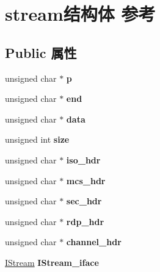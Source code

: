 \hypertarget{structstream}{}\section{stream结构体 参考}
\label{structstream}
\subsection*{Public 属性}
\begin{DoxyCompactItemize}
\item 
\mbox{\label{structstream_a915066714c875e52cfa687d7f29263b4}} 
unsigned char $\ast$ {\bfseries p}
\item 
\mbox{\label{structstream_a31d3762bda1936aae6fb6db2c8a24c20}} 
unsigned char $\ast$ {\bfseries end}
\item 
\mbox{\label{structstream_aa6f3631ab5672ed807cd42dfacf788e9}} 
unsigned char $\ast$ {\bfseries data}
\item 
\mbox{\label{structstream_a99de1abac22ca856543a42f1b8e73a3f}} 
unsigned int {\bfseries size}
\item 
\mbox{\label{structstream_a26977c17a426e04ce3bb335919d5353f}} 
unsigned char $\ast$ {\bfseries iso\+\_\+hdr}
\item 
\mbox{\label{structstream_a977d5d977e0a68aaf2bdb3bfb7163f16}} 
unsigned char $\ast$ {\bfseries mcs\+\_\+hdr}
\item 
\mbox{\label{structstream_a516690a70162124eab23ac16e00ed4ed}} 
unsigned char $\ast$ {\bfseries sec\+\_\+hdr}
\item 
\mbox{\label{structstream_ad64647fcfbee1fc89ea2f3eed72ef1be}} 
unsigned char $\ast$ {\bfseries rdp\+\_\+hdr}
\item 
\mbox{\label{structstream_a115b1d94f5ae8018f7db1b368a4a621b}} 
unsigned char $\ast$ {\bfseries channel\+\_\+hdr}
\item 
\mbox{\label{structstream_ae6567516648dad9cc65336b808e59744}} 
\hyperlink{interface_i_stream}{I\+Stream} {\bfseries I\+Stream\+\_\+iface}

\end{DoxyCompactItemize}
